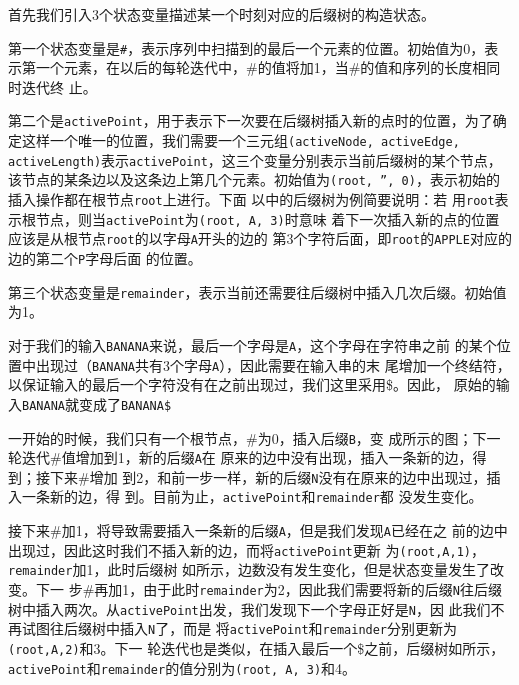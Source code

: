 首先我们引入3个状态变量描述某一个时刻对应的后缀树的构造状态。

第一个状态变量是\texttt{\#}，表示序列中扫描到的最后一个元素的位置。初始值为0，表
示第一个元素，在以后的每轮迭代中，\#的值将加1，当\#的值和序列的长度相同时迭代终
止。
  
第二个是\texttt{activePoint}，用于表示下一次要在后缀树插入新的点时的位置，为了确
定这样一个唯一的位置，我们需要一个三元组\texttt{(activeNode, activeEdge,
  activeLength)}表示\texttt{activePoint}，这三个变量分别表示当前后缀树的某个节点，
该节点的某条边以及这条边上第几个元素。初始值为\texttt{(root, '', 0)}，表示初始的
插入操作都在根节点\texttt{root}上进行。下面
以中的后缀树为例简要说明：若
用\texttt{root}表示根节点，则当\texttt{activePoint}为\texttt{(root, A, 3)}时意味
着下一次插入新的点的位置应该是从根节点\texttt{root}的以字母\texttt{A}开头的边的
第3个字符后面，即\texttt{root}的\texttt{APPLE}对应的边的第二个\texttt{P}字母后面
的位置。
  
第三个状态变量是\texttt{remainder}，表示当前还需要往后缀树中插入几次后缀。初始值
为1。

对于我们的输入\texttt{BANANA}来说，最后一个字母是\texttt{A}，这个字母在字符串之前
的某个位置中出现过（\texttt{BANANA}共有3个字母\texttt{A}），因此需要在输入串的末
尾增加一个终结符，以保证输入的最后一个字符没有在之前出现过，我们这里采用\$。因此，
原始的输入\texttt{BANANA}就变成了\texttt{BANANA\$}

一开始的时候，我们只有一个根节点，\#为0，插入后缀\texttt{B}，变
成所示的图；下一轮迭代\#值增加到1，新的后缀\texttt{A}在
原来的边中没有出现，插入一条新的边，得到；接下来\#增加
到2，和前一步一样，新的后缀\texttt{N}没有在原来的边中出现过，插入一条新的边，得
到。目前为止，\texttt{activePoint}和\texttt{remainder}都
没发生变化。

接下来\#加1，将导致需要插入一条新的后缀\texttt{A}，但是我们发现\texttt{A}已经在之
前的边中出现过，因此这时我们不插入新的边，而将\texttt{activePoint}更新
为\texttt{(root,A,1)}，\texttt{remainder}加1，此时后缀树
如所示，边数没有发生变化，但是状态变量发生了改变。下一
步\#再加1，由于此时\texttt{remainder}为2，因此我们需要将新的后缀\texttt{N}往后缀
树中插入两次。从\texttt{activePoint}出发，我们发现下一个字母正好是\texttt{N}，因
此我们不再试图往后缀树中插入\texttt{N}了，而是
将\texttt{activePoint}和\texttt{remainder}分别更新为\texttt{(root,A,2)}和3。下一
轮迭代也是类似，在插入最后一个\$之前，后缀树如所示，
\texttt{activePoint}和\texttt{remainder}的值分别为\texttt{(root, A, 3)}和4。


